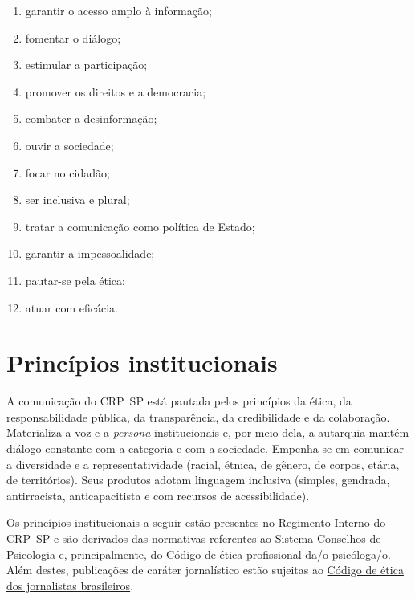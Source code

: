 \begin{enumerate}

	\item
	      garantir o acesso amplo à informação;
	\item
	      fomentar o diálogo;
	\item
	      estimular a participação;
	\item
	      promover os direitos e a democracia;
	\item
	      combater a desinformação;
	\item
	      ouvir a sociedade;
	\item
	      focar no cidadão;
	\item
	      ser inclusiva e plural;
	\item
	      tratar a comunicação como política de Estado;
	\item
	      garantir a impessoalidade;
	\item
	      pautar-se pela ética;
	\item
	      atuar com eficácia.
\end{enumerate}

\section{Princípios
  institucionais}

A comunicação do CRP~SP está pautada pelos princípios da ética, da responsabilidade pública, da transparência, da credibilidade e da colaboração. Materializa a voz e a \emph{persona} institucionais e, por meio dela, a autarquia mantém diálogo constante com a categoria e com a
sociedade. Empenha-se em comunicar a diversidade e a representatividade (racial, étnica, de gênero, de corpos, etária, de territórios). Seus produtos adotam linguagem inclusiva (simples, gendrada, antirracista, anticapacitista e com recursos de acessibilidade).

Os princípios institucionais a seguir estão presentes no \href{https://correio.crpsp.org.br/service/home/~/?auth=co&loc=pt_BR&id=4201&part=6}{Regimento
	Interno} do CRP~SP e são derivados das normativas referentes ao Sistema Conselhos de Psicologia e, principalmente, do \href{https://www.crpsp.org/uploads/pagina/289379/2j9LIMPLJ9jFr5YrK57HmAiBWjVMxdbe.pdf}{{Código de ética profissional da/o psicóloga/o}}. Além destes, publicações de caráter jornalístico estão sujeitas ao \href{https://fenaj.org.br/codigo-de-etica-dos-jornalistas-brasileiros/}{Código de ética dos jornalistas brasileiros}.


